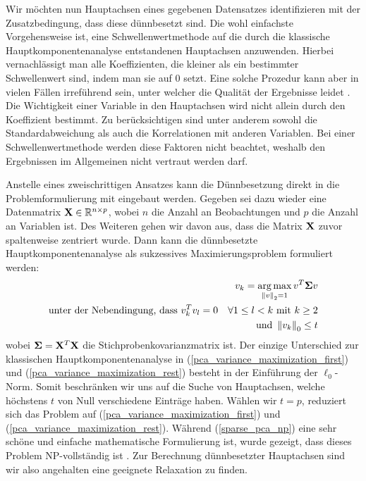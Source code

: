 Wir möchten nun Hauptachsen eines gegebenen Datensatzes identifizieren mit der Zusatzbedingung, dass diese dünnbesetzt sind. Die wohl einfachste Vorgehensweise ist, eine Schwellenwertmethode auf die durch die klassische Hauptkomponentenanalyse entstandenen Hauptachsen anzuwenden. Hierbei vernachlässigt man alle Koeffizienten, die kleiner als ein bestimmter Schwellenwert sind, indem man sie auf 0 setzt. Eine solche Prozedur kann aber in vielen Fällen irreführend sein, unter welcher die Qualität der Ergebnisse leidet \cite{cadima}. Die Wichtigkeit einer Variable in den Hauptachsen wird nicht allein durch den Koeffizient bestimmt. Zu berücksichtigen sind unter anderem sowohl die Standardabweichung als auch die Korrelationen mit anderen Variablen. Bei einer Schwellenwertmethode werden diese Faktoren nicht beachtet, weshalb den Ergebnissen im Allgemeinen nicht vertraut werden darf.

Anstelle eines zweischrittigen Ansatzes kann die Dünnbesetzung direkt in die Problemformulierung mit eingebaut werden. Gegeben sei dazu wieder eine Datenmatrix $\mathbf{X} \in \mathbb{R}^{n \times p}$, wobei $n$ die Anzahl an Beobachtungen und $p$ die Anzahl an Variablen ist. Des Weiteren gehen wir davon aus, dass die Matrix $\mathbf{X}$ zuvor spaltenweise zentriert wurde. Dann kann die dünnbesetzte Hauptkomponentenanalyse als sukzessives Maximierungsproblem formuliert werden:
\begin{gather}
\label{sparse_pca_np}
\begin{split}
v_{k} = \operatorname*{arg\,max}_{\left\lVert v \right\rVert_2 = 1} v^{T}\mathbf{\Sigma} v\\
\text{unter der Nebendingung, dass } v_{k}^Tv_{l} = 0 \quad \forall 1 \leq l < k \text{ mit } k\geq 2\\
\text{und } \left\lVert v_{k} \right\rVert_0 \leq t 
\end{split}
\end{gather}
wobei $\mathbf{\Sigma} = \mathbf{X}^T \mathbf{X}$ die Stichprobenkovarianzmatrix ist. Der einzige Unterschied zur klassischen Hauptkomponentenanalyse in (\ref{pca_variance_maximization_first}) und (\ref{pca_variance_maximization_rest}) besteht in der Einführung der $\ell_0$-Norm. Somit beschränken wir uns auf die Suche von Hauptachsen, welche höchstens $t$ von Null verschiedene Einträge haben. Wählen wir $t = p$, reduziert sich das Problem auf (\ref{pca_variance_maximization_first}) und (\ref{pca_variance_maximization_rest}). Während (\ref{sparse_pca_np}) eine sehr schöne und einfache mathematische Formulierung ist, wurde gezeigt, dass dieses Problem NP-vollständig ist \cite{foucart}. Zur Berechnung dünnbesetzter Hauptachsen sind wir also angehalten eine geeignete Relaxation zu finden.


